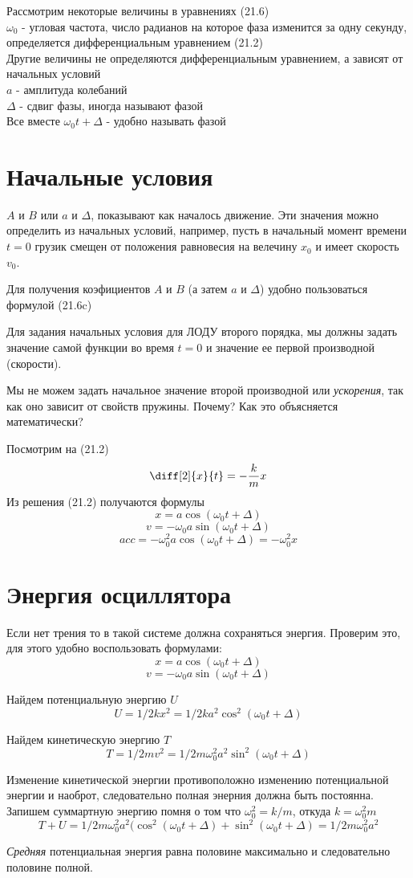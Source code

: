 \documentclass[12pt]{article}
\begin{document}
\medskip

Рассмотрим некоторые величины в уравнениях (21.6)
\\
$\omega_0$ - угловая частота, число радианов на которое фаза изменится за одну секунду, определяется дифференциальным уравнением (21.2)
\\
Другие величины не определяются дифференциальным уравнением, а зависят от начальных условий
\\
$a$ - амплитуда колебаний
\\
$\Delta$ - сдвиг фазы, иногда называют фазой
\\
Все вместе $\omega_0t+\Delta$ - удобно называть фазой

\section{Начальные условия}

$A$ и $B$ или $a$ и $\Delta$, показывают как началось движение. Эти значения можно определить из начальных условий, например, пусть в начальный момент времени $t=0$ грузик смещен от положения равновесия на велечину $x_0$ и имеет скорость  $v_0$.

Для получения коэфициентов $A$ и $B$ (а затем $a$ и $\Delta$) удобно пользоваться формулой (21.6c)

\newpage

Для задания начальных условия для ЛОДУ второго порядка, мы должны задать значение самой функции во время $t=0$ и значение ее первой производной (скорости).

Мы не можем задать начальное значение второй производной или \textit{ускорения}, так как оно зависит от свойств пружины. Почему? Как это объясняется математически?

Посмотрим на (21.2)
\[
\diff[2]{x}{t}=-\frac{k}{m}x
\]
Из решения (21.2) получаются формулы
\[
    x=a\cos(\omega_0t+\Delta)
\]
\[
    v=-\omega_0a\sin(\omega_0t+\Delta)
\]
\[
    acc=-\omega_0^2a\cos(\omega_0t+\Delta)=-\omega_0^2x
\]

\section{Энергия осциллятора}

Если нет трения то в такой системе должна сохраняться энергия. Проверим это, для этого удобно воспользовать формулами:
\[
    x=a\cos(\omega_0t+\Delta)
\]
\[
    v=-\omega_0a\sin(\omega_0t+\Delta)
\]

Найдем потенциальную энергию $U$
\[
    U = 1/2kx^2 = 1/2k a^2 \cos^2(\omega_0t+\Delta)
\]

Найдем кинетическую энергию $T$
\[
    T = 1/2mv^2 = 1/2 m \omega_0^2 a^2 \sin^2(\omega_0t+\Delta)
\]

Изменение кинетической энергии противоположно изменению потенциальной энергии и наоброт, следовательно полная энерния должна быть постоянна. Запишем суммартную энергию помня о том что $\omega_0^2=k/m$, откуда $k=\omega_0^2 m$
\[
    T+U = 1/2 m \omega_0^2 a^2 (\cos^2(\omega_0t+\Delta) + \sin^2(\omega_0t+\Delta) = 1/2 m \omega_0^2 a^2
\]

\textit{Средняя} потенциальная энергия равна половине максимально и следовательно половине полной.
\end{document}
